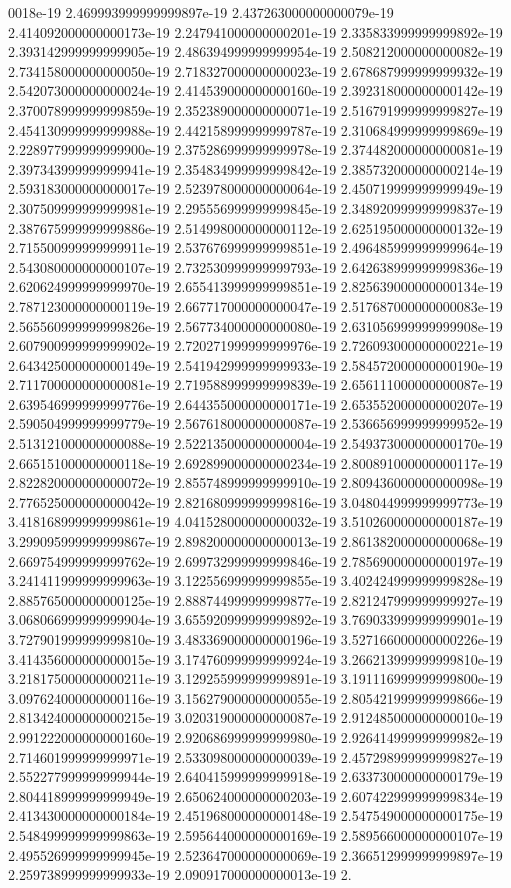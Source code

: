 0018e-19	2.469993999999999897e-19	2.437263000000000079e-19	2.414092000000000173e-19	2.247941000000000201e-19	2.335833999999999892e-19	2.393142999999999905e-19	2.486394999999999954e-19	2.508212000000000082e-19	2.734158000000000050e-19	2.718327000000000023e-19	2.678687999999999932e-19	2.542073000000000024e-19	2.414539000000000160e-19	2.392318000000000142e-19	2.370078999999999859e-19	2.352389000000000071e-19	2.516791999999999827e-19	2.454130999999999988e-19	2.442158999999999787e-19	2.310684999999999869e-19	2.228977999999999900e-19	2.375286999999999978e-19	2.374482000000000081e-19	2.397343999999999941e-19	2.354834999999999842e-19	2.385732000000000214e-19	2.593183000000000017e-19	2.523978000000000064e-19	2.450719999999999949e-19	2.307509999999999981e-19	2.295556999999999845e-19	2.348920999999999837e-19	2.387675999999999886e-19	2.514998000000000112e-19	2.625195000000000132e-19	2.715500999999999911e-19	2.537676999999999851e-19	2.496485999999999964e-19	2.543080000000000107e-19	2.732530999999999793e-19	2.642638999999999836e-19	2.620624999999999970e-19	2.655413999999999851e-19	2.825639000000000134e-19	2.787123000000000119e-19	2.667717000000000047e-19	2.517687000000000083e-19	2.565560999999999826e-19	2.567734000000000080e-19	2.631056999999999908e-19	2.607900999999999902e-19	2.720271999999999976e-19	2.726093000000000221e-19	2.643425000000000149e-19	2.541942999999999933e-19	2.584572000000000190e-19	2.711700000000000081e-19	2.719588999999999839e-19	2.656111000000000087e-19	2.639546999999999776e-19	2.644355000000000171e-19	2.653552000000000207e-19	2.590504999999999779e-19	2.567618000000000087e-19	2.536656999999999952e-19	2.513121000000000088e-19	2.522135000000000004e-19	2.549373000000000170e-19	2.665151000000000118e-19	2.692899000000000234e-19	2.800891000000000117e-19	2.822820000000000072e-19	2.855748999999999910e-19	2.809436000000000098e-19	2.776525000000000042e-19	2.821680999999999816e-19	3.048044999999999773e-19	3.418168999999999861e-19	4.041528000000000032e-19	3.510260000000000187e-19	3.299095999999999867e-19	2.898200000000000013e-19	2.861382000000000068e-19	2.669754999999999762e-19	2.699732999999999846e-19	2.785690000000000197e-19	3.241411999999999963e-19	3.122556999999999855e-19	3.402424999999999828e-19	2.885765000000000125e-19	2.888744999999999877e-19	2.821247999999999927e-19	3.068066999999999904e-19	3.655920999999999892e-19	3.769033999999999901e-19	3.727901999999999810e-19	3.483369000000000196e-19	3.527166000000000226e-19	3.414356000000000015e-19	3.174760999999999924e-19	3.266213999999999810e-19	3.218175000000000211e-19	3.129255999999999891e-19	3.191116999999999800e-19	3.097624000000000116e-19	3.156279000000000055e-19	2.805421999999999866e-19	2.813424000000000215e-19	3.020319000000000087e-19	2.912485000000000010e-19	2.991222000000000160e-19	2.920686999999999980e-19	2.926414999999999982e-19	2.714601999999999971e-19	2.533098000000000039e-19	2.457298999999999827e-19	2.552277999999999944e-19	2.640415999999999918e-19	2.633730000000000179e-19	2.804418999999999949e-19	2.650624000000000203e-19	2.607422999999999834e-19	2.413430000000000184e-19	2.451968000000000148e-19	2.547549000000000175e-19	2.548499999999999863e-19	2.595644000000000169e-19	2.589566000000000107e-19	2.495526999999999945e-19	2.523647000000000069e-19	2.366512999999999897e-19	2.259738999999999933e-19	2.090917000000000013e-19	2.